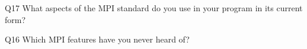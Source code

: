 \begin{description}%
\item{Q17} What aspects of the MPI standard do you use in your program in its current form?%
\item{Q16} Which MPI features have you never heard of?%
\end{description}%
